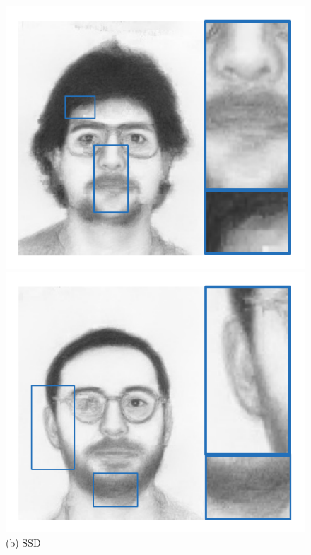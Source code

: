 \documentclass[10pt,twocolumn,letterpaper]{article}
\begin{document}
\begin{figure}[htbp]
\begin{minipage}[t]{0.138\linewidth}
\includegraphics[width=0.99\linewidth]{img/example3_WMRF.pdf}
\includegraphics[width=0.99\linewidth]{img/example4_WMRF.pdf}
(b) SSD
\end{minipage}
\begin{minipage}[t]{0.138\linewidth}
\centering

\end{minipage}
\end{figure}
\end{document}
